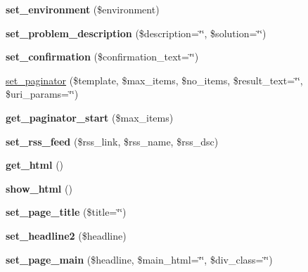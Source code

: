 \begin{DoxyCompactItemize}
\item 
\hypertarget{classlms__portal_a597040942d826050bfc052d8cf81a7f2}{
{\bfseries set\_\-environment} (\$environment)}
\label{classlms__portal_a597040942d826050bfc052d8cf81a7f2}

\item 
\hypertarget{classlms__portal_aa07dcf7a076b8d14d8d602855a8c5f31}{
{\bfseries set\_\-problem\_\-description} (\$description=\char`\"{}\char`\"{}, \$solution=\char`\"{}\char`\"{})}
\label{classlms__portal_aa07dcf7a076b8d14d8d602855a8c5f31}

\item 
\hypertarget{classlms__portal_a856fb9d300b7d10f1e2e729d0df52ad3}{
{\bfseries set\_\-confirmation} (\$confirmation\_\-text=\char`\"{}\char`\"{})}
\label{classlms__portal_a856fb9d300b7d10f1e2e729d0df52ad3}

\item 
\hyperlink{classlms__portal_ab3ef4f52f0c4aeb9e2f82aaf5be8b507}{set\_\-paginator} (\$template, \$max\_\-items, \$no\_\-items, \$result\_\-text=\char`\"{}\char`\"{}, \$uri\_\-params=\char`\"{}\char`\"{})
\item 
\hypertarget{classlms__portal_a59f079d70a58c55b13430617d0868364}{
{\bfseries get\_\-paginator\_\-start} (\$max\_\-items)}
\label{classlms__portal_a59f079d70a58c55b13430617d0868364}

\item 
\hypertarget{classlms__portal_a962b4ebb541c5e2832b9aaecfd04b9cc}{
{\bfseries set\_\-rss\_\-feed} (\$rss\_\-link, \$rss\_\-name, \$rss\_\-dsc)}
\label{classlms__portal_a962b4ebb541c5e2832b9aaecfd04b9cc}

\item 
\hypertarget{classlms__portal_a74028edf7cbd1473cfd9d08c114ab75a}{
{\bfseries get\_\-html} ()}
\label{classlms__portal_a74028edf7cbd1473cfd9d08c114ab75a}

\item 
\hypertarget{classlms__portal_aef51926df1b4c112579c62960748c4ab}{
{\bfseries show\_\-html} ()}
\label{classlms__portal_aef51926df1b4c112579c62960748c4ab}

\item 
\hypertarget{classlms__portal_ac2db2d8e5406dcc247d0fee531641bd5}{
{\bfseries set\_\-page\_\-title} (\$title=\char`\"{}\char`\"{})}
\label{classlms__portal_ac2db2d8e5406dcc247d0fee531641bd5}

\item 
\hypertarget{classlms__portal_aa22d299ee893bc3cf59eb9502c7c76b7}{
{\bfseries set\_\-headline2} (\$headline)}
\label{classlms__portal_aa22d299ee893bc3cf59eb9502c7c76b7}

\item 
\hypertarget{classlms__portal_acb5fa2dabd0fb2d455e060c7c3d95d80}{
{\bfseries set\_\-page\_\-main} (\$headline, \$main\_\-html=\char`\"{}\char`\"{}, \$div\_\-class=\char`\"{}\char`\"{})}
\label{classlms__portal_acb5fa2dabd0fb2d455e060c7c3d95d80}

\end{DoxyCompactItemize}
